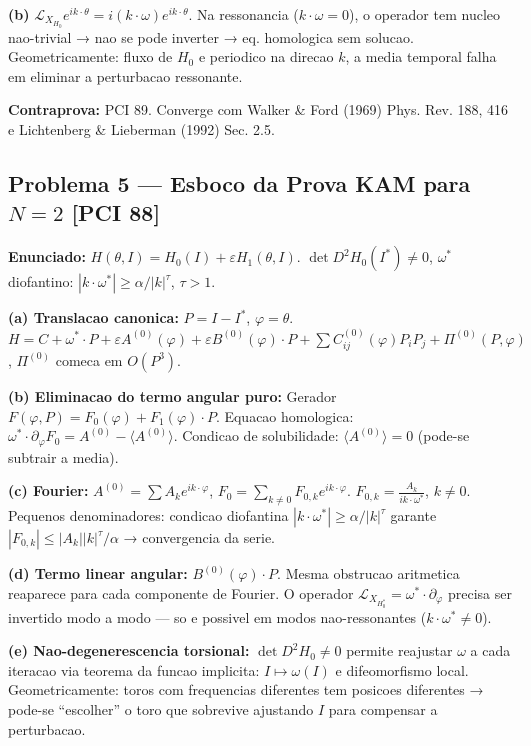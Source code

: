\documentclass[12pt,a4paper,oneside]{article}
\begin{document}
\textbf{(b)} $\mathcal{L}_{X_{H_0}}e^{ik\cdot\theta}=i(k\cdot\omega)e^{ik\cdot\theta}$. Na ressonancia ($k\cdot\omega=0$), o operador tem nucleo nao-trivial → nao se pode inverter → eq. homologica sem solucao. Geometricamente: fluxo de $H_0$ e periodico na direcao $k$, a media temporal falha em eliminar a perturbacao ressonante.

\textbf{Contraprova:} PCI 89. Converge com Walker \& Ford (1969) Phys. Rev. 188, 416 e Lichtenberg \& Lieberman (1992) Sec. 2.5.

\subsection{Problema 5 — Esboco da Prova KAM para $N=2$ [PCI 88]}
\textbf{Enunciado:} $H(\theta,I)=H_0(I)+\varepsilon H_1(\theta,I)$. $\det D^2H_0(I^*)\neq0$, $\omega^*$ diofantino: $|k\cdot\omega^*|\geq\alpha/|k|^\tau$, $\tau>1$.

\textbf{(a) Translacao canonica:} $P=I-I^*$, $\varphi=\theta$.
$H=C+\omega^*\cdot P+\varepsilon A^{(0)}(\varphi)+\varepsilon B^{(0)}(\varphi)\cdot P+\sum C^{(0)}_{ij}(\varphi)P_iP_j+\Pi^{(0)}(P,\varphi)$, $\Pi^{(0)}$ comeca em $O(P^3)$.

\textbf{(b) Eliminacao do termo angular puro:} Gerador $F(\varphi,P)=F_0(\varphi)+F_1(\varphi)\cdot P$.
Equacao homologica: $\omega^*\cdot\partial_\varphi F_0=A^{(0)}-\langle A^{(0)}\rangle$.
Condicao de solubilidade: $\langle A^{(0)}\rangle=0$ (pode-se subtrair a media).

\textbf{(c) Fourier:} $A^{(0)}=\sum A_k e^{ik\cdot\varphi}$, $F_0=\sum_{k\neq0}F_{0,k}e^{ik\cdot\varphi}$.
$F_{0,k}=\frac{A_k}{ik\cdot\omega^*}$, $k\neq0$. Pequenos denominadores: condicao diofantina $|k\cdot\omega^*|\geq\alpha/|k|^\tau$ garante $|F_{0,k}|\leq|A_k||k|^\tau/\alpha$ → convergencia da serie.

\textbf{(d) Termo linear angular:} $B^{(0)}(\varphi)\cdot P$. Mesma obstrucao aritmetica reaparece para cada componente de Fourier. O operador $\mathcal{L}_{X_{H_0^*}}=\omega^*\cdot\partial_\varphi$ precisa ser invertido modo a modo — so e possivel em modos nao-ressonantes ($k\cdot\omega^*\neq0$).

\textbf{(e) Nao-degenerescencia torsional:} $\det D^2H_0\neq0$ permite reajustar $\omega$ a cada iteracao via teorema da funcao implicita: $I\mapsto\omega(I)$ e difeomorfismo local. Geometricamente: toros com frequencias diferentes tem posicoes diferentes → pode-se ``escolher'' o toro que sobrevive ajustando $I$ para compensar a perturbacao.
\end{document}
